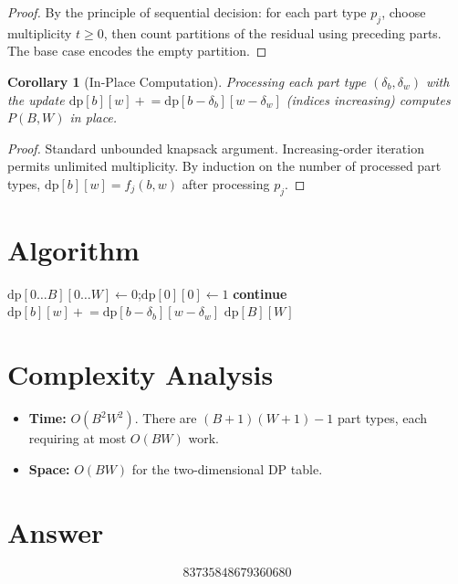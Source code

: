 \documentclass[12pt]{article}
\newtheorem{corollary}[theorem]{Corollary}
\begin{document}
\begin{proof}
By the principle of sequential decision: for each part type $p_j$, choose multiplicity $t \ge 0$, then count partitions of the residual using preceding parts. The base case encodes the empty partition.
\end{proof}

\begin{corollary}[In-Place Computation]
Processing each part type $(\delta_b, \delta_w)$ with the update $\mathrm{dp}[b][w] \mathrel{+}= \mathrm{dp}[b - \delta_b][w - \delta_w]$ (indices increasing) computes $P(B, W)$ in place.
\end{corollary}

\begin{proof}
Standard unbounded knapsack argument. Increasing-order iteration permits unlimited multiplicity. By induction on the number of processed part types, $\mathrm{dp}[b][w] = f_j(b,w)$ after processing $p_j$.
\end{proof}

\section{Algorithm}

\begin{algorithmic}[1]
    \State $\mathrm{dp}[0 \ldots B][0 \ldots W] \gets 0$;\quad $\mathrm{dp}[0][0] \gets 1$
             \textbf{continue} \EndIf
                    \State $\mathrm{dp}[b][w] \mathrel{+}= \mathrm{dp}[b - \delta_b][w - \delta_w]$
                \EndFor
            \EndFor
        \EndFor
    \EndFor
    \State \Return $\mathrm{dp}[B][W]$
\EndFunction
\end{algorithmic}

\section{Complexity Analysis}

\begin{itemize}
    \item \textbf{Time:} $O(B^2 W^2)$. There are $(B+1)(W+1)-1$ part types, each requiring at most $O(BW)$ work.
    \item \textbf{Space:} $O(BW)$ for the two-dimensional DP table.
\end{itemize}

\section{Answer}

\[
\boxed{83735848679360680}
\]
\end{document}
